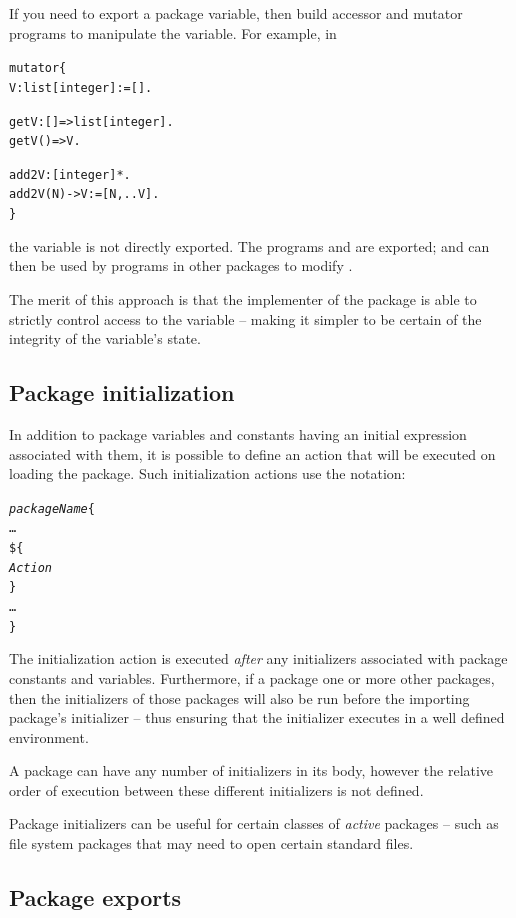 If you need to export a package variable, then build accessor and mutator programs to manipulate the variable. For example, in
\begin{alltt}
mutator\{
  V : list[integer] := [].
  
  getV:[]=>list[integer].
  getV() => V.
  
  add2V:[integer]*.
  add2V(N) -> V := [N,..V].
\}
\end{alltt}
the variable  is not directly exported. The programs  and  are exported; and can then be used by programs in other packages to modify .

The merit of this approach is that the implementer of the  package is able to strictly control access to the variable -- making it simpler to be certain of the integrity of the variable's state.

\subsection{Package initialization}
\label{package:initialization}

In addition to package variables and constants having an initial expression associated with them, it is possible to define an action that will be executed on loading the package. Such initialization actions use the notation:
\begin{alltt}
\emph{packageName}\{
  \ldots
  \$ \{
    \emph{Action}
  \}
  \ldots
\}
\end{alltt}
The initialization action is executed \emph{after} any initializers associated with package constants and variables. Furthermore, if a package  one or more other packages, then the initializers of those packages will also be run before the importing package's initializer -- thus ensuring that the initializer executes in a well defined environment.

A package can have any number of initializers in its body, however the relative order of execution between these different initializers is not defined.

Package initializers can be useful for certain classes of \emph{active} packages -- such as file system packages that may need to open certain standard files.

\subsection{Package exports}
\label{package:export}

